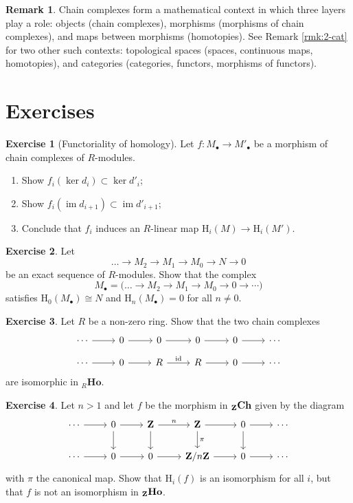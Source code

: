 \documentclass[11pt]{amsbook}
\DeclareMathOperator\im{im}
\def\rH{{\mathrm H}} \def\rK{{\mathrm K}} \def\rR{{\mathrm R}}
\def\id{{\rm id}}
\def\Ch{\mathbf{Ch}}
\def\Ho{\mathbf{Ho}}
\theoremstyle{plain}
\theoremstyle{definition}
\newtheorem{remark}[theorem]{Remark}
\newtheorem{exercise}{Exercise}
\begin{document}
\begin{remark}
Chain complexes form a mathematical context in which three layers play a role: objects (chain complexes), morphisms (morphisms of chain complexes), and maps between morphisms (homotopies). See Remark \ref{rmk:2-cat} for two other such contexts: topological spaces (spaces, continuous maps, homotopies), and categories (categories, functors, morphisms of functors).
\end{remark}


\newpage
\section*{Exercises}

\begin{exercise}[Functoriality of homology]\label{exc:induced-morphism-on-homology}
Let $f\colon M_\bullet \to M'_\bullet$ be a morphism of chain complexes of $R$-modules. 
\begin{enumerate}
\item Show  $f_i(\ker d_i) \subset \ker d'_i$;
\item Show $f_i(\im d_{i+1}) \subset \im d'_{i+1}$;
\item Conclude that $f_i$ induces an $R$-linear map $\rH_i(M) \to \rH_i(M')$.
\end{enumerate}
\end{exercise}

\begin{exercise}
Let 
\[
	\ldots \to M_2 \to M_1 \to M_0 \to N \to 0
\]
be an exact sequence of $R$-modules. Show that the complex
\[
	M_\bullet = \big( \ldots \to M_2 \to M_1 \to M_0  \to 0 \to \cdots \big)
\]
satisfies $\rH_0(M_\bullet)\cong N$ and $\rH_n(M_\bullet)=0$ for all $n\neq 0$.
\end{exercise}


\begin{exercise}\label{exc:an-isomorphism-in-the-homotopy-category}
Let $R$ be a non-zero ring. Show that the  two chain complexes
\[
\begin{tikzcd}[row sep=small]
\cdots \arrow{r}
	& 0 \arrow{r}
	& 0 \arrow{r}
	& 0 \arrow{r}
	& 0 \arrow{r}
	&\cdots \\ 
\cdots \arrow{r}
	& 0 \arrow{r}
	& R \arrow{r}{\id}
	& R \arrow{r}
	& 0 \arrow{r}
	&\cdots
\end{tikzcd}
\]
are isomorphic in ${}_R\Ho$.
\end{exercise}

\begin{exercise}Let $n>1$ and let $f$ be the morphism in ${}_\bZ\Ch$ given by the diagram
\[
\begin{tikzcd}
\cdots \arrow{r}
	& 0 \arrow{r} \arrow{d}
	& \bZ \arrow{r}{n} \arrow{d}
	& \bZ \arrow{r} \arrow{d}{\pi}
	& 0 \arrow{r} \arrow{d}
	&\cdots \\ 
\cdots \arrow{r}
	& 0 \arrow{r}
	& 0 \arrow{r}
	& \bZ/n\bZ \arrow{r}
	& 0 \arrow{r}
	&\cdots
\end{tikzcd}
\]
with $\pi$ the canonical map. Show that $\rH_i(f)$ is an isomorphism for all $i$, but that $f$ is not an isomorphism in ${}_\bZ\Ho$.
\end{exercise}
\end{document}
